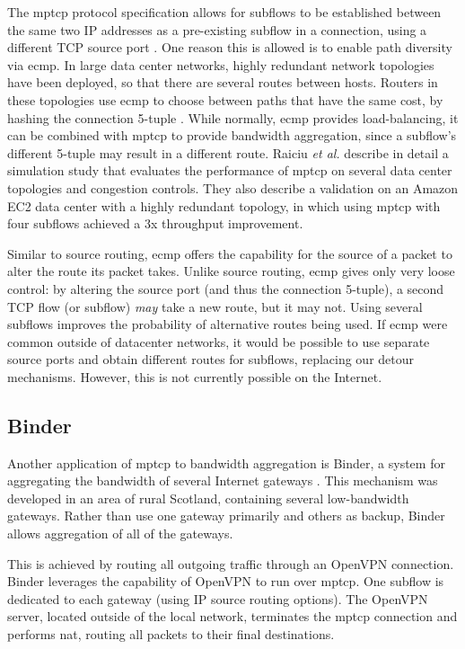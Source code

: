 \documentclass{cwru}
\begin{document}
The \ac{mptcp} protocol specification allows for subflows to be established
between the same two IP addresses as a pre-existing subflow in a connection,
using a different TCP source port \cite{rfc6824}. One reason this is allowed is
to enable path diversity via \acf{ecmp}. In large data center networks, highly
redundant network topologies have been deployed, so that there are several
routes between hosts. Routers in these topologies use \ac{ecmp} to choose
between paths that have the same cost, by hashing the connection 5-tuple
\cite{raiciu2011improving}. While normally, \ac{ecmp} provides load-balancing,
it can be combined with \ac{mptcp} to provide bandwidth aggregation, since a
subflow's different 5-tuple may result in a different route. Raiciu \textit{et
  al.} \cite{raiciu2011improving} describe in detail a simulation study that
evaluates the performance of \ac{mptcp} on several data center topologies and
congestion controls. They also describe a validation on an Amazon EC2 data
center with a highly redundant topology, in which using \ac{mptcp} with four
subflows achieved a 3x throughput improvement.

Similar to source routing, \ac{ecmp} offers the capability for the source of a
packet to alter the route its packet takes. Unlike source routing, \ac{ecmp}
gives only very loose control: by altering the source port (and thus the
connection 5-tuple), a second TCP flow (or subflow) \textit{may} take a new
route, but it may not. Using several subflows improves the probability of
alternative routes being used. If \ac{ecmp} were common outside of datacenter
networks, it would be possible to use separate source ports and obtain different
routes for subflows, replacing our detour mechanisms. However, this is not
currently possible on the Internet.

\subsection{Binder}

Another application of \ac{mptcp} to bandwidth aggregation is Binder, a system
for aggregating the bandwidth of several Internet gateways \cite{binder}. This
mechanism was developed in an area of rural Scotland, containing several
low-bandwidth gateways. Rather than use one gateway primarily and others as
backup, Binder allows aggregation of all of the gateways.

This is achieved by routing all outgoing traffic through an OpenVPN connection.
Binder leverages the capability of OpenVPN to run over \ac{mptcp}. One subflow
is dedicated to each gateway (using IP source routing options). The OpenVPN
server, located outside of the local network, terminates the \ac{mptcp}
connection and performs \ac{nat}, routing all packets to their final
destinations.
\end{document}
